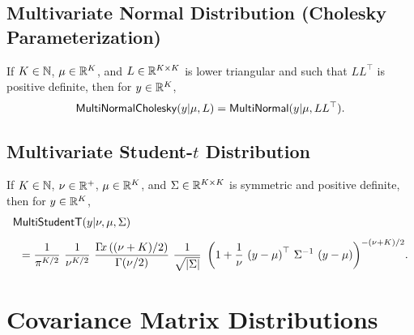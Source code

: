 \subsection{Multivariate Normal Distribution (Cholesky Parameterization)}

If $K \in \mathbb{N}$, $\mu \in \mathbb{R}^K$, and $L \in \mathbb{R}^{K \times K}$ is lower
triangular and such that $LL^{\top}$ is positive definite, then for $y
\in \mathbb{R}^K$,
\[
\mbox{\sf MultiNormalCholesky}(y|\mu,L)
=
\mbox{\sf MultiNormal}(y|\mu,LL^{\top}).
\]

\begin{description}
%
%
\end{description}


\subsection{Multivariate Student-$t$ Distribution}

If $K \in \mathbb{N}$, $\nu \in \mathbb{R}^+$, $\mu \in \mathbb{R}^K$, and $\Sigma
\in \mathbb{R}^{K \times K}$ is symmetric and positive definite, then for
$y \in \mathbb{R}^K$,
\[
\begin{array}{l}
\mbox{\sf MultiStudentT}(y|\nu,\mu,\Sigma)
\\[8pt]
\displaystyle
\hspace*{8pt}
=
\frac{1}{\pi^{K/2}}
\
\frac{1}{\nu^{K/2}}
\
\frac{\Gamma\!x\left((\nu + K)/2\right)}
     {\Gamma(\nu/2)}
\
\frac{1}{\sqrt{\left| \Sigma \right|}}
\
\left(
1 + \frac{1}{\nu} \, \left(y - \mu\right)^{\top} \, \Sigma^{-1} \, \left(y - \mu\right)
\right)^{-(\nu + K)/2}
\! .
\end{array}
\]
\vspace*{4pt}

\begin{description}
%
%
\end{description}



\section{Covariance Matrix Distributions}

